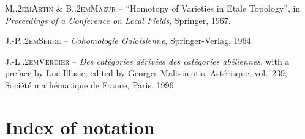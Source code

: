 \documentclass[11pt,a4paper,oneside]{book}
\providecommand{\sisi}[2]{#2}
\providecommand{\og}{``}
\providecommand{\fg}{''\xspace}
\providecommand{\ptbl}{.\kern.2em}
\theoremstyle{plain}
\theoremstyle{definition}
\theoremstyle{remark}
\begin{document}
\begin{thebibliography}{9}
\sisi{%
M\ptbl Artin et B\ptbl Mazur, Homotopy of Varieties in Etale Topology, in Proceedings of a Conference on Local Fields, Springer (1967).}
{%
\textsc{M\ptbl Artin \& B\ptbl Mazur} -- {\og Homotopy of Varieties in Etale Topology\fg}, in \emph{Proceedings of a Conference on Local Fields}, Springer, 1967.
}
\sisi{%
J.-P\ptbl Serre, Cohomologie Galoisienne, Springer-Verlag, 1964.}
{%
\textsc{J.-P\ptbl Serre} -- \emph{Cohomologie Galoisienne}, Springer-Verlag, 1964.
}
\sisi{%
J.-L\ptbl Verdier, Alg\`ebre homologique et Cat\'egories d\'eriv\'ees, North.\ Holland Pub.\ Cie.\, to appear}
{%
\textsc{J.-L\ptbl Verdier} -- \emph{Des cat\'egories d\'eriv\'ees des cat\'egories ab\'eliennes}, with a preface by Luc Illusie, edited by Georges Maltsiniotis, Ast\'erisque, vol.~239, Soci\'et\'e math\'ematique de France, Paris, 1996.
}
\end{thebibliography}

\chapter*{Index of notation}
\end{document}
